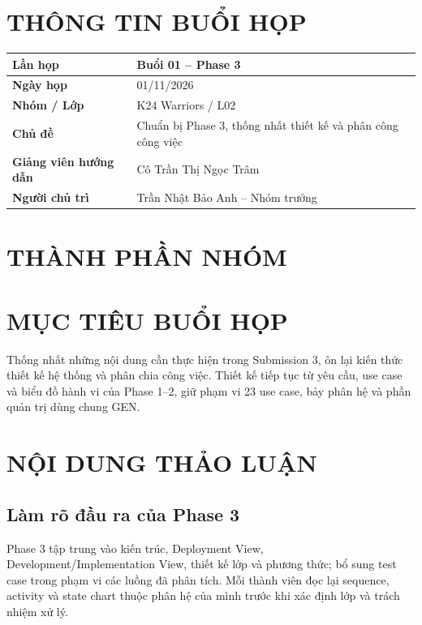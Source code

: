 \documentclass[10pt,a4paper]{article}
\begin{document}
\MakeHCMUTCover
{}
\section{THÔNG TIN BUỔI HỌP}
\begin{center}
\begin{tabularx}{\textwidth}{|>{\bfseries}L{43mm}|Y|}
\hline
Lần họp & Buổi 01 -- Phase 3\\\hline
Ngày họp & 01/11/2026\\\hline
Nhóm / Lớp & K24 Warriors / L02\\\hline
Chủ đề & Chuẩn bị Phase 3, thống nhất thiết kế và phân công công việc\\\hline
Giảng viên hướng dẫn & Cô Trần Thị Ngọc Trâm\\\hline
Người chủ trì & Trần Nhật Bảo Anh -- Nhóm trưởng\\\hline
\end{tabularx}
\end{center}
\section{THÀNH PHẦN NHÓM}
\begin{HCMUTMemberTable}
\end{HCMUTMemberTable}
\section{MỤC TIÊU BUỔI HỌP}
Thống nhất những nội dung cần thực hiện trong Submission 3, ôn lại kiến thức thiết kế hệ thống và phân chia công việc. Thiết kế tiếp tục từ yêu cầu, use case và biểu đồ hành vi của Phase 1--2, giữ phạm vi 23 use case, bảy phân hệ và phần quản trị dùng chung GEN.

\section{NỘI DUNG THẢO LUẬN}
\subsection{Làm rõ đầu ra của Phase 3}
Phase 3 tập trung vào kiến trúc, Deployment View, Development/Implementation View, thiết kế lớp và phương thức; bổ sung test case trong phạm vi các luồng đã phân tích. Mỗi thành viên đọc lại sequence, activity và state chart thuộc phân hệ của mình trước khi xác định lớp và trách nhiệm xử lý.
\end{document}
